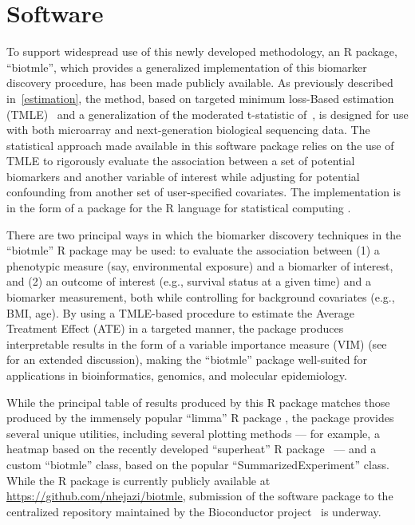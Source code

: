 \chapter{Software}

To support widespread use of this newly developed methodology, an R package,
``biotmle'', which provides a generalized implementation of this biomarker
discovery procedure, has been made publicly available. As previously described
in~\ref{estimation}, the method, based on targeted minimum loss-Based
estimation (TMLE)~\cite{van2011targeted} and a generalization of the moderated
t-statistic of~\cite{smyth2004linear}, is designed for use with both microarray
and next-generation biological sequencing data. The statistical approach made
available in this software package relies on the use of TMLE to rigorously
evaluate the association between a set of potential biomarkers and another
variable of interest while adjusting for potential confounding from another set
of user-specified covariates. The implementation is in the form of a package for
the R language for statistical computing \cite{R}.

There are two principal ways in which the biomarker discovery techniques in
the ``biotmle'' R package may be used: to evaluate the association between (1) a
phenotypic measure (say, environmental exposure) and a biomarker of interest,
and (2) an outcome of interest (e.g., survival status at a given time) and a
biomarker measurement, both while controlling for background covariates (e.g.,
BMI, age). By using a TMLE-based procedure to estimate the Average Treatment
Effect (ATE) in a targeted manner, the package produces interpretable results
in the form of a variable importance measure (VIM) (see~\cite{van2011targeted}
for an extended discussion), making the ``biotmle'' package well-suited for
applications in bioinformatics, genomics, and molecular epidemiology.

While the principal table of results produced by this R package matches those
produced by the immensely popular ``limma'' R package \cite{smyth2005limma},
the package provides several unique utilities, including several plotting
methods --- for example, a heatmap based on the recently developed ``superheat''
R package~\cite{barter2017superheat} --- and a custom ``biotmle'' class,
based on the popular ``SummarizedExperiment'' class. While the R package is
currently publicly available at \url{https://github.com/nhejazi/biotmle},
submission of the software package to the centralized repository maintained by
the Bioconductor project~\cite{gentleman2004bioconductor} is underway.
